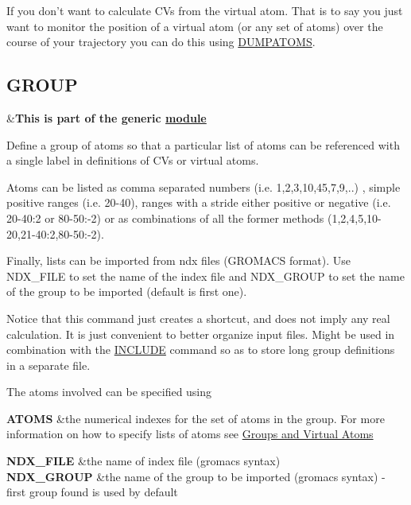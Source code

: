 If you don't want to calculate C\+Vs from the virtual atom. That is to say you just want to monitor the position of a virtual atom (or any set of atoms) over the course of your trajectory you can do this using \hyperlink{DUMPATOMS}{D\+U\+M\+P\+A\+T\+O\+M\+S}. \hypertarget{GROUP}{}\subsection{G\+R\+O\+U\+P}\label{GROUP}
\begin{TabularC}{2}
\hline
&{\bfseries  This is part of the generic \hyperlink{mymodules}{module }}   \\
\end{TabularC}
Define a group of atoms so that a particular list of atoms can be referenced with a single label in definitions of C\+Vs or virtual atoms.

Atoms can be listed as comma separated numbers (i.\+e. 1,2,3,10,45,7,9,..) , simple positive ranges (i.\+e. 20-\/40), ranges with a stride either positive or negative (i.\+e. 20-\/40\+:2 or 80-\/50\+:-\/2) or as combinations of all the former methods (1,2,4,5,10-\/20,21-\/40\+:2,80-\/50\+:-\/2).

Finally, lists can be imported from ndx files (G\+R\+O\+M\+A\+C\+S format). Use N\+D\+X\+\_\+\+F\+I\+L\+E to set the name of the index file and N\+D\+X\+\_\+\+G\+R\+O\+U\+P to set the name of the group to be imported (default is first one).

Notice that this command just creates a shortcut, and does not imply any real calculation. It is just convenient to better organize input files. Might be used in combination with the \hyperlink{INCLUDE}{I\+N\+C\+L\+U\+D\+E} command so as to store long group definitions in a separate file.

\begin{DoxyParagraph}{The atoms involved can be specified using}

\end{DoxyParagraph}
\begin{TabularC}{2}
\hline
{\bfseries  A\+T\+O\+M\+S } &the numerical indexes for the set of atoms in the group. For more information on how to specify lists of atoms see \hyperlink{Group}{Groups and Virtual Atoms}   \\
\end{TabularC}


\begin{TabularC}{2}
\hline
{\bfseries  N\+D\+X\+\_\+\+F\+I\+L\+E } &the name of index file (gromacs syntax)   \\
{\bfseries  N\+D\+X\+\_\+\+G\+R\+O\+U\+P } &the name of the group to be imported (gromacs syntax) -\/ first group found is used by default  

\\
\end{TabularC}


